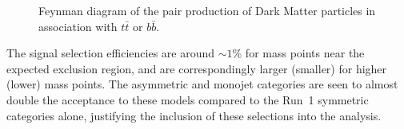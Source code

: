\begin{figure}[h!] \centering
{}
\caption{Feynman diagram of the pair production of Dark Matter particles in
association with $t\bar{t}$ or $b\bar{b}$. \cite{Abercrombie:2015wmb}}
\label{fig:feynman_hf} \end{figure}

The signal selection efficiencies are around $\sim 1$\% for mass points near the expected exclusion
region, and are correspondingly larger (smaller) for higher (lower) mass points.
The asymmetric and monojet categories are seen to almost double the acceptance
to these models compared to the Run~1 symmetric categories alone, justifying the
inclusion of these selections into the analysis.

